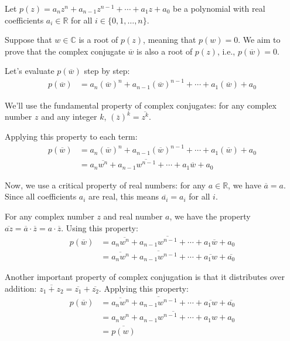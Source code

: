 \documentclass[a4paper, 10pt]{article}
\begin{document}
\begin{proofbox}

  Let $p(z) = a_nz^n + a_{n-1}z^{n-1} + \cdots + a_1z + a_0$ be a polynomial with real coefficients $a_i \in \mathbb{R}$ for all $i \in \{0,1,\ldots,n\}$.

  Suppose that $w \in \mathbb{C}$ is a root of $p(z)$, meaning that $p(w) = 0$. We aim to prove that the complex conjugate $\overline{w}$ is also a root of $p(z)$, i.e., $p(\overline{w}) = 0$.

  Let's evaluate $p(\overline{w})$ step by step:
  \begin{align}
    p(\overline{w}) & = a_n(\overline{w})^n + a_{n-1}(\overline{w})^{n-1} + \cdots + a_1(\overline{w}) + a_0
  \end{align}

  We'll use the fundamental property of complex conjugates: for any complex number $z$ and any integer $k$, $(\overline{z})^k = \overline{z^k}$.

  Applying this property to each term:
  \begin{align}
    p(\overline{w}) & = a_n(\overline{w})^n + a_{n-1}(\overline{w})^{n-1} + \cdots + a_1(\overline{w}) + a_0 \\
                    & = a_n\overline{w^n} + a_{n-1}\overline{w^{n-1}} + \cdots + a_1\overline{w} + a_0
  \end{align}

  Now, we use a critical property of real numbers: for any $a \in \mathbb{R}$, we have $\overline{a} = a$. Since all coefficients $a_i$ are real, this means $\overline{a_i} = a_i$ for all $i$.

  For any complex number $z$ and real number $a$, we have the property $\overline{az} = \overline{a} \cdot \overline{z} = a \cdot \overline{z}$. Using this property:
  \begin{align}
    p(\overline{w}) & = a_n\overline{w^n} + a_{n-1}\overline{w^{n-1}} + \cdots + a_1\overline{w} + a_0              \\
                    & = \overline{a_n w^n} + \overline{a_{n-1}w^{n-1}} + \cdots + \overline{a_1 w} + \overline{a_0}
  \end{align}

  Another important property of complex conjugation is that it distributes over addition: $\overline{z_1 + z_2} = \overline{z_1} + \overline{z_2}$. Applying this property:
  \begin{align}
    p(\overline{w}) & = \overline{a_n w^n} + \overline{a_{n-1}w^{n-1}} + \cdots + \overline{a_1 w} + \overline{a_0} \\
                    & = \overline{a_n w^n + a_{n-1}w^{n-1} + \cdots + a_1 w + a_0}                                  \\
                    & = \overline{p(w)}
  \end{align}


\end{proofbox}
\end{document}
